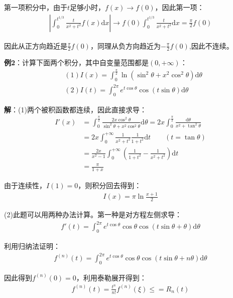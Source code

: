 \documentclass{ctexart}
\let\oldtextbf\textbf
\renewcommand{\textbf}[1]{\textcolor{brown!50!red}{\oldtextbf{#1}}}
\begin{document}
第一项积分中，由于$t$足够小时，$f(x)\to f(0)$，因此第一项：
\begin{align*}
\left|\int_0^{t^{1/3}}\frac{t}{x^2+t^2}f(x)\mathrm{d}x\right|\to f(0)\int_0^{t^{1/3}}
\frac{t}{x^2+t^2}\mathrm{d}x=\frac{\pi}{2}f(0)
\end{align*}

因此从正方向趋近是$\frac{\pi}{2}f(0)$，同理从负方向趋近为$-\frac{\pi}{2}f(0)$,因此不连续。

\textbf{\color{brown!50!red}例2}：计算下面两个积分，其中自变量范围都是$(0,+\infty)$：
\begin{align*}
&   (1) I(x)=\int_0^{\frac{\pi}{2}}\ln(\sin^2\theta+x^2\cos^2\theta)\mathrm{d}\theta\\
&(2)I(t)=\int_0^{2\pi}e^{t\cos\theta}\cos(t\sin\theta)\mathrm{d}\theta
\end{align*}

\textbf{\color{brown!50!red}解}：(1)两个被积函数都连续，因此直接求导：
\begin{align*}
I'(x)&=\int_0^{\frac{\pi}{2}}\frac{2x\cos^2\theta}{\sin^2\theta+x^2\cos^2\theta}\mathrm{d}\theta=2x\int_0^{\frac{\pi}{2}}
\frac{\mathrm{d}\theta }{x^2+\tan^2\theta}\\
&= 2x\int_0^{+\infty}\frac{1}{x^2+t^2}\frac{1}{1+t^2}\mathrm{d}t\qquad (t=\tan\theta)\\
&=\frac{2x}{x^2-1}\int_0^{+\infty}(\frac{1}{1+t^2}-\frac{1}{x^2+t^2} )\mathrm{d}t\\
&=\frac{\pi}{1+x}     
\end{align*}

由于连续性，$I(1)=0$，则积分回去得到：
\begin{align*}
    I(x)=\pi\ln\frac{x+1}{2}
\end{align*}

(2)此题可以用两种办法计算。第一种是对方程左侧求导：
\begin{align*}
f'(t)=\int_0^{2\pi}e^{t\cos\theta}\cos\theta\cos(t\sin\theta+\theta)\mathrm{d}\theta
\end{align*}

利用归纳法证明：
\begin{align*}
f^{(n)}(t)=\int_0^{2\pi}e^{t\cos\theta}\cos\theta\cos(t\sin\theta+n\theta)\mathrm{d}\theta
\end{align*}

因此得到$f^{(n)}(0)=0$，利用泰勒展开得到：
\begin{align*}
    f^{(n)}(t)=\frac{t^n}{n!}f^{(n)}(\xi)\leq=R_n(t)
\end{align*}
\end{document}
